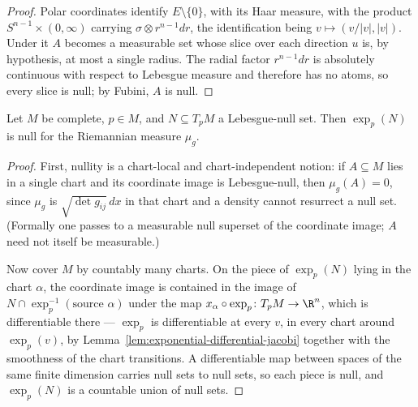 \begin{proof}
\sketch
\leanok
Polar coordinates identify $E\setminus\{0\}$, with its Haar measure,
with the product $S^{n-1}\times(0,\infty)$ carrying
$\sigma\otimes r^{n-1}dr$, the identification being $v\mapsto
(v/\lvert v\rvert,\lvert v\rvert)$. Under it $A$ becomes a measurable
set whose slice over each direction $u$ is, by hypothesis, at most a
single radius. The radial factor $r^{n-1}dr$ is absolutely continuous
with respect to Lebesgue measure and therefore has no atoms, so every
slice is null; by Fubini, $A$ is null.
\end{proof}

\begin{lemma}
\label{lem:exp-preserves-null}
\leanok



Let $M$ be complete, $p\in M$, and $N\subseteq T_pM$ a Lebesgue-null
set. Then $\exp_p(N)$ is null for the Riemannian measure $\mu_g$.
\end{lemma}

\begin{proof}
\sketch
{}
\leanok
First, nullity is a chart-local and chart-independent notion: if
$A\subseteq M$ lies in a single chart and its coordinate image is
Lebesgue-null, then $\mu_g(A)=0$, since $\mu_g$ is
$\sqrt{\det g_{ij}}\,dx$ in that chart and a density cannot resurrect a
null set. (Formally one passes to a measurable null superset of the
coordinate image; $A$ need not itself be measurable.)

Now cover $M$ by countably many charts. On the piece of $\exp_p(N)$
lying in the chart $\alpha$, the coordinate image is contained in the
image of $N\cap\exp_p^{-1}(\text{source }\alpha)$ under the map
$x_\alpha\circ\exp_p\colon T_pM\to\R^n$, which is differentiable there
--- $\exp_p$ is differentiable at every $v$, in every chart around
$\exp_p(v)$, by Lemma~\ref{lem:exponential-differential-jacobi}
together with the smoothness of the chart transitions. A differentiable
map between spaces of the same finite dimension carries null sets to
null sets, so each piece is null, and $\exp_p(N)$ is a countable union
of null sets.
\end{proof}


